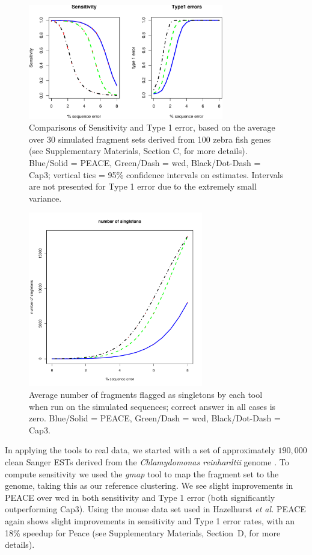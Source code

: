 \documentclass[a4,center,fleqn]{NAR}
\newcommand{\peace} {{\small PEACE}}
\begin{document}
\begin{figure}
  \centerline{\includegraphics[width=3.35in]{pics.d/SeT1.pdf}}
  \caption{Comparisons of Sensitivity and Type 1 error, based on the
    average over 30 simulated fragment sets derived from 100 zebra
    fish genes (see Supplementary Materials, Section C, for more
    details).  Blue/Solid = \peace, Green/Dash = {\sc wcd},
    Black/Dot-Dash = {\sc Cap3}; vertical tics = 95\% confidence
    intervals on estimates.  Intervals are not presented for Type 1
    error due to the extremely small variance.}\label{SeT1}
\end{figure}

\begin{figure}
  \centerline{\includegraphics[width=3in]{pics.d/singletons.pdf}}
  \caption{Average number of fragments flagged as singletons by each tool
    when run on the simulated sequences; correct answer in all cases is
    zero.  Blue/Solid = \peace, Green/Dash = {\sc wcd},
    Black/Dot-Dash = {\sc Cap3}.}\label{singletons}
\end{figure}

In applying the tools to real data, we started with a set of
approximately $190,000$ clean Sanger ESTs derived from the {\it
  Chlamydomonas reinhardtii} genome \cite{Liang2008}.  To compute
sensitivity we used the {\it gmap} tool \cite{Wu05} to map the
fragment set to the genome, taking this as our reference clustering.
We see slight improvements in \peace\/ over {\sc wcd} in both
sensitivity and Type 1 error (both significantly outperforming {\sc
  Cap3}).  Using the mouse data set used in Hazelhurst {\it et al.}
\cite{Hazelhurst08a} \peace\/ again shows slight improvements in
sensitivity and Type 1 error rates, with an 18\% speedup for {\sc
  Peace} (see Supplementary Materials, Section~D, for more details).
\end{document}
